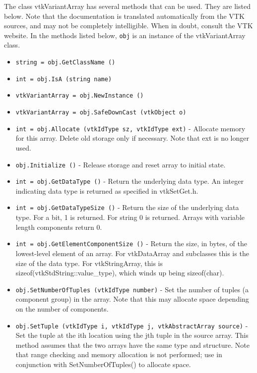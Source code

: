 The class vtkVariantArray has several methods that can be used.
  They are listed below.
Note that the documentation is translated automatically from the VTK sources,
and may not be completely intelligible.  When in doubt, consult the VTK website.
In the methods listed below, \verb|obj| is an instance of the vtkVariantArray class.
\begin{itemize}
\item  \verb|string = obj.GetClassName ()|

\item  \verb|int = obj.IsA (string name)|

\item  \verb|vtkVariantArray = obj.NewInstance ()|

\item  \verb|vtkVariantArray = obj.SafeDownCast (vtkObject o)|

\item  \verb|int = obj.Allocate (vtkIdType sz, vtkIdType ext)| -  Allocate memory for this array. Delete old storage only if necessary.
 Note that ext is no longer used.

\item  \verb|obj.Initialize ()| -  Release storage and reset array to initial state.

\item  \verb|int = obj.GetDataType ()| -  Return the underlying data type. An integer indicating data type is 
 returned as specified in vtkSetGet.h.

\item  \verb|int = obj.GetDataTypeSize ()| -  Return the size of the underlying data type.  For a bit, 1 is
 returned.  For string 0 is returned. Arrays with variable length
 components return 0.

\item  \verb|int = obj.GetElementComponentSize ()| -  Return the size, in bytes, of the lowest-level element of an
 array.  For vtkDataArray and subclasses this is the size of the
 data type.  For vtkStringArray, this is
 sizeof(vtkStdString::value\_type), which winds up being
 sizeof(char).  

\item  \verb|obj.SetNumberOfTuples (vtkIdType number)| -  Set the number of tuples (a component group) in the array. Note that 
 this may allocate space depending on the number of components.

\item  \verb|obj.SetTuple (vtkIdType i, vtkIdType j, vtkAbstractArray source)| -  Set the tuple at the ith location using the jth tuple in the source array.
 This method assumes that the two arrays have the same type
 and structure. Note that range checking and memory allocation is not 
 performed; use in conjunction with SetNumberOfTuples() to allocate space.


\end{itemize}
